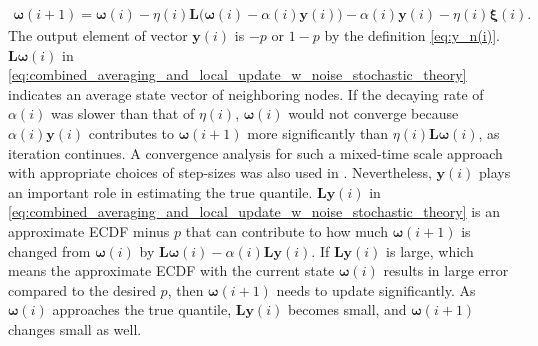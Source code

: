 \documentclass[journal]{IEEEtran}
\begin{document}
\vspace{-4mm}
\small
\begin{align}
{}{
\bm{\omega}(i+1) = \bm{\omega}(i) - \eta(i)\mathbf{L}\big(\bm{\omega}(i)  - \alpha(i)\mathbf{y}(i)\big) - \alpha(i) \mathbf{y}(i) - \eta(i)\bm{\xi}(i).} \label{eq:combined_averaging_and_local_update_w_noise_stochastic_theory}
\end{align}
\normalsize
{}{The output element of vector $\mathbf{y}(i)$ is $-p$ or $1-p$ by the definition \eqref{eq:y_n(i)}. $\mathbf{L}\bm{\omega}(i)$ in \eqref{eq:combined_averaging_and_local_update_w_noise_stochastic_theory} indicates an average state vector of neighboring nodes. If the decaying rate of $\alpha(i)$ was slower than that of $\eta(i)$, $\bm{\omega}(i)$ would not converge because $\alpha(i)\mathbf{y}(i)$ contributes to $\bm{\omega}(i+1)$ more significantly than $\eta(i)\mathbf{L}\bm{\omega}(i)$, as iteration continues. A convergence analysis for such a mixed-time scale approach with appropriate choices of step-sizes was also used in \cite{Kar2012}. Nevertheless, $\mathbf{y}(i)$ plays an important role in estimating the true quantile. $\mathbf{L}\mathbf{y}(i)$ in \eqref{eq:combined_averaging_and_local_update_w_noise_stochastic_theory} is an approximate ECDF minus $p$ that can contribute to how much $\bm{\omega}(i+1)$ is changed from $\bm{\omega}(i)$ by $\mathbf{L}\bm{\omega}(i) - \alpha(i)\mathbf{L}\mathbf{y}(i)$. If $\mathbf{L}\mathbf{y}(i)$ is large, which means the approximate ECDF with the current state $\bm{\omega}(i)$ results in large error compared to the desired $p$, then $\bm{\omega}(i+1)$ needs to update significantly. As $\bm{\omega}(i)$ approaches the true quantile, $\mathbf{L}\mathbf{y}(i)$ becomes small, and $\bm{\omega}(i+1)$ changes small as well. }
	

\end{document}
